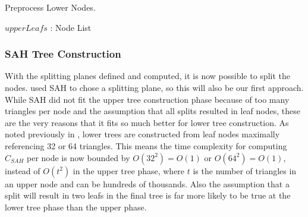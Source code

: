 \begin{algorithm}
  \caption{Preprocess Lower Nodes.}
  \label{alg:calcSplittingPlanes}
  \begin{algorithmic}
              {$upperLeafs$ : Node List}
              {}{
                    \ENDFOR
                  \ENDFOR
                \ENDFOR
              }
  \end{algorithmic}
\end{algorithm}



\subsubsection{SAH Tree Construction}


With the splitting planes defined and computed, it is now possible to split the
nodes. \zhou{} used SAH to chose a splitting plane, so this will also be our
first approach. While SAH did not fit the upper tree construction phase because
of too many triangles per node and the assumption that all splits resulted in
leaf nodes, these are the very reasons that it fits so much better for lower
tree construction. As noted previously in ,
lower trees are constructed from leaf nodes maximally referencing 32 or 64
triangles. This means the time complexity for computing $C_{SAH}$ per node is
now bounded by $O(32^2) = O(1)$ or $O(64^2) = O(1)$, instead of $O(t^2)$ in the
upper tree phase, where $t$ is the number of triangles in an upper node and can
be hundreds of thousands. Also the assumption that a split will result in two
leafs in the final tree is far more likely to be true at the lower tree phase
than the upper phase.

